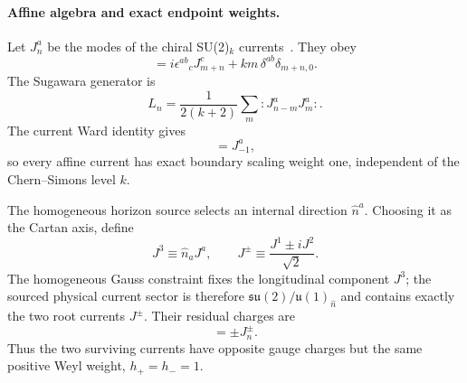\documentclass[aps,prd,twocolumn,10pt,superscriptaddress,nofootinbib]{revtex4-2}
\begin{document}
\paragraph{Affine algebra and exact endpoint weights.}
Let $J^a_n$ be the modes of the chiral SU(2)$_k$ currents~\cite{Witten1989,EMSS1989,DiFrancesco1997}.  They obey
\begin{equation}
 [J^a_m,J^b_n]
 =i\epsilon^{ab}{}_{c}J^c_{m+n}
 +k m\,\delta^{ab}\delta_{m+n,0}.
\label{eq:micro2_affine_algebra}
\end{equation}
The Sugawara generator is
\begin{equation}
 L_n=\frac{1}{2(k+2)}\sum_m :J^a_{n-m}J^a_m: .
\label{eq:micro2_sugawara}
\end{equation}
The current Ward identity gives
\begin{equation}
 [L_0,J^a_{-1}]=J^a_{-1},
\label{eq:micro2_current_weight}
\end{equation}
so every affine current has exact boundary scaling weight one,
independent of the Chern--Simons level $k$.

The homogeneous horizon source selects an internal direction $\hat n^a$.
Choosing it as the Cartan axis, define
\begin{equation}
 J^3\equiv \hat n_aJ^a,
 \qquad
 J^\pm\equiv\frac{J^1\pm iJ^2}{\sqrt2}.
\end{equation}
The homogeneous Gauss constraint fixes the longitudinal component $J^3$;
the sourced physical current sector is therefore
$\mathfrak{su}(2)/\mathfrak{u}(1)_{\hat n}$ and contains exactly the two
root currents $J^\pm$.  Their residual charges are
\begin{equation}
 [J^3_0,J^\pm_n]=\pm J^\pm_n.
\label{eq:micro2_root_charge}
\end{equation}
Thus the two surviving currents have opposite gauge charges but the same
positive Weyl weight, $h_+=h_-=1$.
\end{document}
